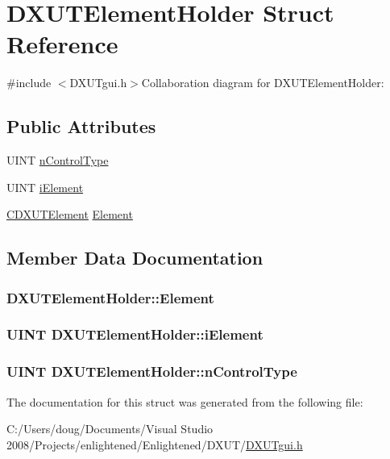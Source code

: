 \hypertarget{struct_d_x_u_t_element_holder}{
\section{DXUTElementHolder Struct Reference}
\label{struct_d_x_u_t_element_holder}
}


{\ttfamily \#include $<$DXUTgui.h$>$}Collaboration diagram for DXUTElementHolder:\subsection*{Public Attributes}
\begin{DoxyCompactItemize}
\item 
UINT \hyperlink{struct_d_x_u_t_element_holder_ae2a3a39c164131b44d6db44802364dad}{nControlType}
\item 
UINT \hyperlink{struct_d_x_u_t_element_holder_ac66b78134099b50e4530e511f853c1e2}{iElement}
\item 
\hyperlink{class_c_d_x_u_t_element}{CDXUTElement} \hyperlink{struct_d_x_u_t_element_holder_adcd7b3a9ece5b1f3843a98b6b01fff82}{Element}
\end{DoxyCompactItemize}


\subsection{Member Data Documentation}
\hypertarget{struct_d_x_u_t_element_holder_adcd7b3a9ece5b1f3843a98b6b01fff82}{
\subsubsection[{Element}]{ {\bf DXUTElementHolder::Element}}}
\label{struct_d_x_u_t_element_holder_adcd7b3a9ece5b1f3843a98b6b01fff82}
\hypertarget{struct_d_x_u_t_element_holder_ac66b78134099b50e4530e511f853c1e2}{
\subsubsection[{iElement}]{\setlength{\rightskip}{0pt plus 5cm}UINT {\bf DXUTElementHolder::iElement}}}
\label{struct_d_x_u_t_element_holder_ac66b78134099b50e4530e511f853c1e2}
\hypertarget{struct_d_x_u_t_element_holder_ae2a3a39c164131b44d6db44802364dad}{
\subsubsection[{nControlType}]{\setlength{\rightskip}{0pt plus 5cm}UINT {\bf DXUTElementHolder::nControlType}}}
\label{struct_d_x_u_t_element_holder_ae2a3a39c164131b44d6db44802364dad}


The documentation for this struct was generated from the following file:\begin{DoxyCompactItemize}
\item 
C:/Users/doug/Documents/Visual Studio 2008/Projects/enlightened/Enlightened/DXUT/\hyperlink{_d_x_u_tgui_8h}{DXUTgui.h}\end{DoxyCompactItemize}
